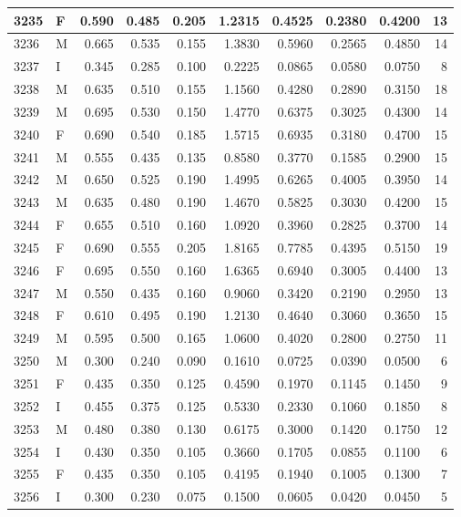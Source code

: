 \documentclass[9pt,twocolumn,twoside,]{pnas-new}
\begin{document}
\begin{tabular}{l|l|r|r|r|r|r|r|r|r}
\hline
3235 & F & 0.590 & 0.485 & 0.205 & 1.2315 & 0.4525 & 0.2380 & 0.4200 & 13\\
\hline
3236 & M & 0.665 & 0.535 & 0.155 & 1.3830 & 0.5960 & 0.2565 & 0.4850 & 14\\
\hline
3237 & I & 0.345 & 0.285 & 0.100 & 0.2225 & 0.0865 & 0.0580 & 0.0750 & 8\\
\hline
3238 & M & 0.635 & 0.510 & 0.155 & 1.1560 & 0.4280 & 0.2890 & 0.3150 & 18\\
\hline
3239 & M & 0.695 & 0.530 & 0.150 & 1.4770 & 0.6375 & 0.3025 & 0.4300 & 14\\
\hline
3240 & F & 0.690 & 0.540 & 0.185 & 1.5715 & 0.6935 & 0.3180 & 0.4700 & 15\\
\hline
3241 & M & 0.555 & 0.435 & 0.135 & 0.8580 & 0.3770 & 0.1585 & 0.2900 & 15\\
\hline
3242 & M & 0.650 & 0.525 & 0.190 & 1.4995 & 0.6265 & 0.4005 & 0.3950 & 14\\
\hline
3243 & M & 0.635 & 0.480 & 0.190 & 1.4670 & 0.5825 & 0.3030 & 0.4200 & 15\\
\hline
3244 & F & 0.655 & 0.510 & 0.160 & 1.0920 & 0.3960 & 0.2825 & 0.3700 & 14\\
\hline
3245 & F & 0.690 & 0.555 & 0.205 & 1.8165 & 0.7785 & 0.4395 & 0.5150 & 19\\
\hline
3246 & F & 0.695 & 0.550 & 0.160 & 1.6365 & 0.6940 & 0.3005 & 0.4400 & 13\\
\hline
3247 & M & 0.550 & 0.435 & 0.160 & 0.9060 & 0.3420 & 0.2190 & 0.2950 & 13\\
\hline
3248 & F & 0.610 & 0.495 & 0.190 & 1.2130 & 0.4640 & 0.3060 & 0.3650 & 15\\
\hline
3249 & M & 0.595 & 0.500 & 0.165 & 1.0600 & 0.4020 & 0.2800 & 0.2750 & 11\\
\hline
3250 & M & 0.300 & 0.240 & 0.090 & 0.1610 & 0.0725 & 0.0390 & 0.0500 & 6\\
\hline
3251 & F & 0.435 & 0.350 & 0.125 & 0.4590 & 0.1970 & 0.1145 & 0.1450 & 9\\
\hline
3252 & I & 0.455 & 0.375 & 0.125 & 0.5330 & 0.2330 & 0.1060 & 0.1850 & 8\\
\hline
3253 & M & 0.480 & 0.380 & 0.130 & 0.6175 & 0.3000 & 0.1420 & 0.1750 & 12\\
\hline
3254 & I & 0.430 & 0.350 & 0.105 & 0.3660 & 0.1705 & 0.0855 & 0.1100 & 6\\
\hline
3255 & F & 0.435 & 0.350 & 0.105 & 0.4195 & 0.1940 & 0.1005 & 0.1300 & 7\\
\hline
3256 & I & 0.300 & 0.230 & 0.075 & 0.1500 & 0.0605 & 0.0420 & 0.0450 & 5\\

\end{tabular}
\end{document}
